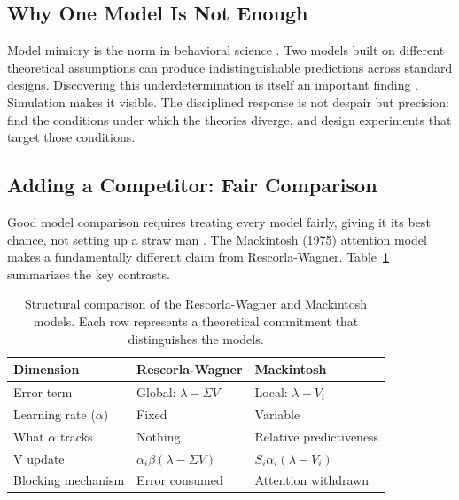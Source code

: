 \documentclass[fleqn,10pt]{wlscirep}
\begin{document}
\begin{linenumbers}
\subsection{Why One Model Is Not Enough}

Model mimicry is the norm in behavioral science \citep{jones2014unfalsifiability, pitt2002toward}. Two models built on different theoretical assumptions can produce indistinguishable predictions across standard designs. Discovering this underdetermination is itself an important finding \citep{navarro2019devil}. Simulation makes it visible. The disciplined response is not despair but precision: find the conditions under which the theories diverge, and design experiments that target those conditions.

\subsection{Adding a Competitor: Fair Comparison}

Good model comparison requires treating every model fairly, giving it its best chance, not setting up a straw man \citep{kruschke2008models}. The Mackintosh (1975) attention model \citep{mackintosh1975theory} makes a fundamentally different claim from Rescorla-Wagner. Table~\ref{tab:model_comparison} summarizes the key contrasts.

\begin{table}[t]
\centering
\small
\caption{Structural comparison of the Rescorla-Wagner and Mackintosh models. Each row represents a theoretical commitment that distinguishes the models.}
\label{tab:model_comparison}
\begin{tabular}{lll}
\toprule
\textbf{Dimension} & \textbf{Rescorla-Wagner} & \textbf{Mackintosh} \\
\midrule
Error term & Global: $\lambda - \Sigma V$ & Local: $\lambda - V_i$ \\
Learning rate ($\alpha$) & Fixed & Variable \\
What $\alpha$ tracks & Nothing & Relative predictiveness \\
V update & $\alpha_i \beta (\lambda - \Sigma V)$ & $S_i \alpha_i (\lambda - V_i)$ \\
Blocking mechanism & Error consumed & Attention withdrawn \\
\bottomrule
\end{tabular}
\end{table}


\end{linenumbers}
\end{document}
